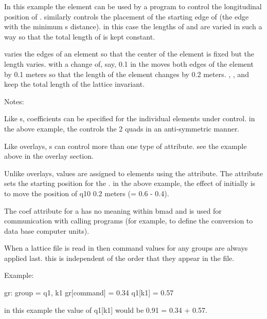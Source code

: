 In this example the  element  can be used by a program to 
control the longitudinal position of . similarly  controls the 
placement of the starting edge of  (the edge with the minimum s distance). 
in this case the lengths of  and  are varied in such a way so that the 
total length of  is kept constant. 

 varies the edges of an element so that the center of the 
element is fixed but the length varies. with  a change of, 
say, 0.1 in the  moves both edges of the element by 0.1 meters 
so that the length of the element changes by 0.2 meters. , 
,  and  keep the total length of the 
lattice invariant. 

Notes: 
\begin{Itemize}
\item	Like s, coefficients can be specified for the individual 
elements under  control. in the above example, the   
controls the 2 quads in an anti-symmetric manner. 
\item	Like overlays, s can control more than one type of attribute. 
see the example above in the overlay section. 
\item	Unlike overlays, values are assigned to  elements using the 
 attribute. The attribute  sets the starting position for 
the . in the above example, the effect of  initially is to 
move the position of q10 0.2 meters (= 0.6 - 0.4). 
\item	The coef attribute for a  has no meaning within bmad and is 
used for communication with calling programs (for example, to define the 
conversion to data base computer units). 
\item	When a lattice file is read in then command values for any groups are 
always applied last. this is independent of the order that they appear in the file. 
\end{Itemize}
Example:
\begin{example} 
  gr: group = {q1}, k1 
  gr[command] = 0.34 
  q1[k1] = 0.57
\end{example}

in this example the value of q1[k1] would be 0.91 = 0.34 + 0.57. 




